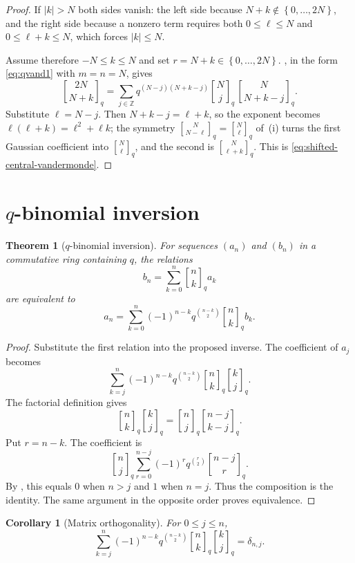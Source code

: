 \documentclass[11pt,oneside,openany]{book}
\newtheorem{theorem}{Theorem}[chapter]
\newtheorem{corollary}[corollary]{Corollary}
\theoremstyle{definition}
\theoremstyle{remark}
\newcommand{\qbinom}[2]{\genfrac{[}{]}{0pt}{}{#1}{#2}_{q}}
\newcommand{\Z}{\mathbb Z}
\newcommand{\abs}[1]{\lvert #1\rvert}
\newcommand{\set}[1]{\left\{#1\right\}}
\begin{document}
\begin{proof}
If $\abs k>N$ both sides vanish: the left side because $N+k\notin\set{0,\dots,2N}$, and the right side because a nonzero term requires both $0\le\ell\le N$ and $0\le\ell+k\le N$, which forces $\abs k\le N$.

Assume therefore $-N\le k\le N$ and set $r=N+k\in\set{0,\dots,2N}$.  , in the form \eqref{eq:qvand1} with $m=n=N$, gives
\[
 \qbinom{2N}{N+k}
 =\sum_{j\in\Z}q^{(N-j)(N+k-j)}
 \qbinom Nj\,\qbinom N{N+k-j}.
\]
Substitute $\ell=N-j$.  Then $N+k-j=\ell+k$, so the exponent becomes $\ell(\ell+k)=\ell^2+\ell k$; the symmetry $\qbinom N{N-\ell}=\qbinom N\ell$ of \,(i) turns the first Gaussian coefficient into $\qbinom N\ell$, and the second is $\qbinom N{\ell+k}$.  This is \eqref{eq:shifted-central-vandermonde}.
\end{proof}

\section{\texorpdfstring{$q$}{q}-binomial inversion}

\begin{theorem}[$q$-binomial inversion]\label{thm:qbinomial-inversion}
For sequences $(a_n)$ and $(b_n)$ in a commutative ring containing $q$, the relations
\[
 b_n=\sum_{k=0}^{n}\qbinom nk a_k
\]
are equivalent to
\[
 a_n=\sum_{k=0}^{n}(-1)^{n-k}q^{\binom{n-k}{2}}\qbinom nk b_k.
\]
\end{theorem}

\begin{proof}
Substitute the first relation into the proposed inverse.  The coefficient of $a_j$ becomes
\[
 \sum_{k=j}^{n}(-1)^{n-k}q^{\binom{n-k}{2}}
 \qbinom nk\qbinom kj.
\]
The factorial definition gives
\[
 \qbinom nk\qbinom kj=\qbinom nj\qbinom{n-j}{k-j}.
\]
Put $r=n-k$.  The coefficient is
\[
 \qbinom nj
 \sum_{r=0}^{n-j}(-1)^rq^{\binom r2}\qbinom{n-j}{r}.
\]
By , this equals $0$ when $n>j$ and $1$ when $n=j$.  Thus the composition is the identity.  The same argument in the opposite order proves equivalence.
\end{proof}

\begin{corollary}[Matrix orthogonality]\label{cor:qbinomial-orthogonality}
For $0\le j\le n$,
\[
 \sum_{k=j}^{n}(-1)^{n-k}q^{\binom{n-k}{2}}
 \qbinom nk\qbinom kj=\delta_{n,j}.
\]
\end{corollary}
\end{document}
